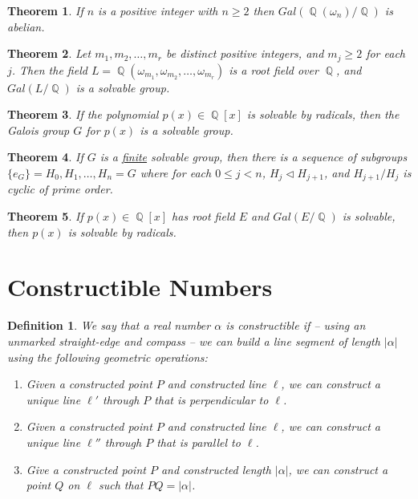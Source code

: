 \documentclass[letterpaper, 12pt]{article}
\DeclareMathOperator{\Q}{\mathbb{Q}}
\newtheorem{defn}{Definition}
\newtheorem{thm}{Theorem}
\begin{document}
			\begin{thm}
			If $n$ is a positive integer with $n \geq 2$ then $Gal(\Q(\omega_{n})/\Q)$ is abelian.
			\end{thm}

			\begin{thm}
			Let $m_{1}, m_{2}, \dots,m_{r}$ be distinct positive integers, and $m_{j} \geq 2$ for each $j$.
			Then the field $L = \Q(\omega_{m_{1}}, \omega_{m_{2}}, \dots, \omega_{m_{r}})$ is a root field over $\Q$, and $Gal(L/\Q)$ is a solvable group.
			\end{thm}

			\begin{thm}
			If the polynomial $p(x) \in \Q[x]$ is solvable by radicals, then the Galois group $G$ for $p(x)$ is a solvable group.
			\end{thm}

			\setcounter{thm}{19}
			\begin{thm}
			If $G$ is a \underline{finite} solvable group, then there is a sequence of subgroups $\{ e_{G} \} = H_{0},H_{1},\dots,H_{n} = G$ where for each $0 \leq j < n$, $H_{j} \triangleleft H_{j+1}$, and $H_{j+1}/H_{j}$ is cyclic of prime order.
			\end{thm}

			\begin{thm}
			If $p(x) \in \Q[x]$ has root field $E$ and $Gal(E/\Q)$ is solvable, then $p(x)$ is solvable by radicals.
			\end{thm}

	\section{Constructible Numbers}
	\label{sec:constructible_numbers}
		\setcounter{defn}{21}
		\begin{defn}
			We say that a real number $\alpha$ is constructible if -- using an unmarked straight-edge and compass -- we can build a line segment of length $|\alpha|$ using the following geometric operations:
			\begin{enumerate}[\hspace*{2.5mm}(i)]
				\item Given a constructed point $P$ and constructed line $\ell$, we can construct a unique line $\ell'$ through $P$ that is perpendicular to $\ell$.
				\item Given a constructed point $P$ and constructed line $\ell$, we can construct a unique line $\ell''$ through $P$ that is parallel to $\ell$.
				\item Give a constructed point $P$ and constructed length $|\alpha|$, we can construct a point $Q$ on $\ell$ such that $PQ = |\alpha|$.
			\end{enumerate}
		\end{defn}
\end{document}
